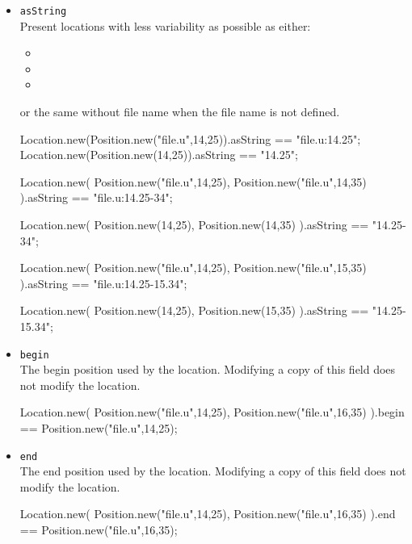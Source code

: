 \begin{itemize}

\item \lstinline|asString|\\
  Present locations with less variability as possible as either:
  \begin{itemize}
  \item {}
  \item {}
  \item {}
  \end{itemize}
  or the same without file name when the file name is not defined.
\begin{urbiassert}[firstnumber=last]
Location.new(Position.new("file.u",14,25)).asString == "file.u:14.25";
Location.new(Position.new(14,25)).asString == "14.25";

Location.new(
  Position.new("file.u",14,25),
  Position.new("file.u",14,35)
).asString == "file.u:14.25-34";

Location.new(
  Position.new(14,25),
  Position.new(14,35)
).asString == "14.25-34";

Location.new(
  Position.new("file.u",14,25),
  Position.new("file.u",15,35)
).asString == "file.u:14.25-15.34";

Location.new(
  Position.new(14,25),
  Position.new(15,35)
).asString == "14.25-15.34";
\end{urbiassert}

\item \lstinline|begin|\\
  The begin position used by the location.  Modifying a copy of this field
  does not modify the location.
\begin{urbiassert}[firstnumber=last]
Location.new(
  Position.new("file.u",14,25),
  Position.new("file.u",16,35)
).begin == Position.new("file.u",14,25);
\end{urbiassert}

\item \lstinline|end|\\
  The end position used by the location.  Modifying a copy of this field
  does not modify the location.
\begin{urbiassert}[firstnumber=last]
Location.new(
  Position.new("file.u",14,25),
  Position.new("file.u",16,35)
).end == Position.new("file.u",16,35);
\end{urbiassert}


\end{itemize}

